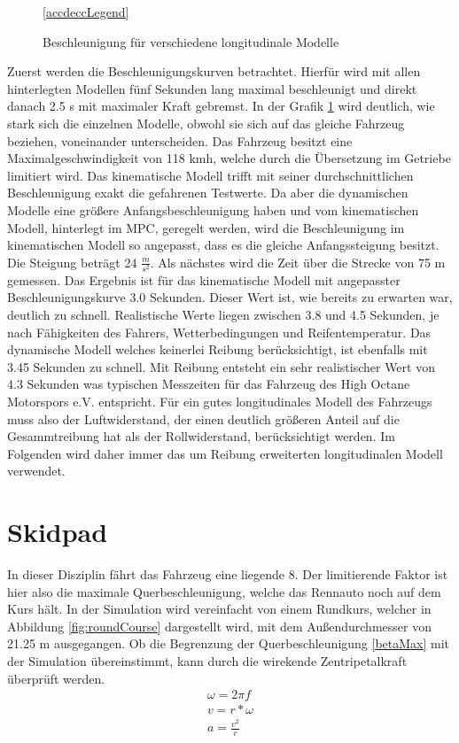 \documentclass{like}
\begin{document}
\begin{figure}
	\centering
	 
	\ref{accdeccLegend}
	\caption{Beschleunigung für verschiedene longitudinale Modelle}
	\label{fig:accdec}
\end{figure}
Zuerst werden die Beschleunigungskurven betrachtet. Hierfür wird mit allen hinterlegten Modellen fünf Sekunden lang maximal beschleunigt und direkt danach 2.5 s mit maximaler Kraft gebremst.
In der Grafik \ref{fig:accdec} wird deutlich, wie stark sich die einzelnen Modelle, obwohl sie sich auf das gleiche Fahrzeug beziehen, voneinander unterscheiden. Das Fahrzeug besitzt eine Maximalgeschwindigkeit von 118 kmh, welche durch die Übersetzung im Getriebe limitiert wird. Das kinematische Modell trifft mit seiner durchschnittlichen Beschleunigung exakt die gefahrenen Testwerte. Da aber die dynamischen Modelle eine größere Anfangsbeschleunigung haben und vom kinematischen Modell, hinterlegt im \ac{MPC}, geregelt werden, wird die Beschleunigung im kinematischen Modell so angepasst, dass es die gleiche Anfangssteigung besitzt. Die Steigung beträgt 24 $\frac{m}{s^2}$. 
Als nächstes wird die Zeit über die Strecke von 75 m gemessen. Das Ergebnis ist für das kinematische Modell mit angepasster Beschleunigungskurve 3.0 Sekunden. Dieser Wert ist, wie bereits zu erwarten war, deutlich zu schnell. Realistische Werte liegen zwischen 3.8 und 4.5 Sekunden, je nach Fähigkeiten des Fahrers, Wetterbedingungen und Reifentemperatur. Das dynamische Modell welches keinerlei Reibung berücksichtigt, ist ebenfalls mit 3.45 Sekunden zu schnell. Mit Reibung entsteht ein sehr realistischer Wert von 4.3 Sekunden was typischen Messzeiten für das Fahrzeug des High Octane Motorspors e.V. entspricht. Für ein gutes longitudinales Modell des Fahrzeugs muss also der Luftwiderstand, der einen deutlich größeren Anteil auf die Gesammtreibung hat als der Rollwiderstand, berücksichtigt werden. Im Folgenden wird daher immer das um Reibung erweiterten longitudinalen Modell verwendet.


\section{Skidpad}
In dieser Disziplin fährt das Fahrzeug eine liegende 8. Der limitierende Faktor ist hier also die maximale Querbeschleunigung, welche das Rennauto noch auf dem Kurs hält. In der Simulation wird vereinfacht von einem Rundkurs, welcher in Abbildung \ref{fig:roundCourse} dargestellt wird, mit dem Außendurchmesser von 21.25 m ausgegangen. Ob die Begrenzung der Querbeschleunigung \ref{betaMax} mit der Simulation übereinstimmt, kann durch die wirekende Zentripetalkraft überprüft werden.
\begin{eqnarray}
	 \omega = 2 \pi f \\
	 v = r * \omega \\
	a = \frac{v^2}{r}
\end{eqnarray}
\end{document}
